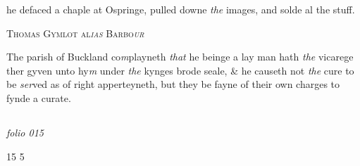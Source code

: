 \documentclass[12pt, a4paper]{book}
\begin{document}
		\ifthenelse{\isodd{\thepage}}
		{\reversemarginpar}
		{\normalmarginpar}
		he defaced a chaple at Ospringe, pulled downe \textit{the} images, and solde al the stuff.
 

            
            
            	
				\begin{center} \begin{large} {\scshape Thomas Gymlot al\textit{ias} Barbo\textit{ur}
               } \end{large} \end{center}
			
            	
		\ifthenelse{\isodd{\thepage}}
		{\reversemarginpar}
		{\normalmarginpar}
		The parish of Buckland co\textit{m}playneth \textit{that} he beinge
 a lay man hath \textit{the} vicarege ther gyven unto hy\textit{m}
 under \textit{the} kynges brode seale, \& he causeth not \textit{the} cure
 to be \textit{ser}ved as of right apperteyneth, but they be
 fayne of their own charges to fynde a curate.


            
\dotfill
						\newpage {} \subsection*{}  \subsection*{}  \subsection*{}  \subsection*{}  \subsection*{}

\textit{folio 015}


\begin{flushright}{\color{Mahogany}15} 5\end{flushright}
 
\end{document}
